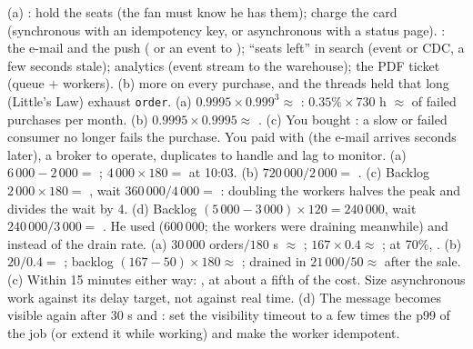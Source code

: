  (a) : hold the seats (the fan must know he has them); charge the card (synchronous with an idempotency key, or asynchronous with a status page). : the e-mail and the push ( or an event to ); ``seats left'' in search (event or CDC, a few seconds stale); analytics (event stream to the warehouse); the PDF ticket (queue $+$ workers). (b)  more on every purchase, and the threads held that long (Little's Law) exhaust \texttt{order}.
 (a) $0.9995 \times 0.999^3 \approx$ : $0.35\% \times 730$ h $\approx$  of failed purchases per month. (b) $0.9995 \times 0.9995 \approx$ . (c) You bought : a slow or failed consumer no longer fails the purchase. You paid with  (the e-mail arrives seconds later), a broker to operate, duplicates to handle and lag to monitor.
 (a) $6\,000 - 2\,000 =$ ; $4\,000 \times 180 =$  at 10:03. (b) $720\,000 / 2\,000 =$ . (c) Backlog $2\,000 \times 180 =$ , wait $360\,000/4\,000 =$ : doubling the workers halves the peak and divides the wait by 4. (d) Backlog $(5\,000 - 3\,000) \times 120 = 240\,000$, wait $240\,000/3\,000 =$ . He used  (600\,000; the workers were draining meanwhile) and  instead of the drain rate.
 (a) $30\,000$ orders$/180$ s $\approx$ ; $167 \times 0.4 \approx$ ; at 70\%, . (b) $20/0.4 =$ ; backlog $(167 - 50) \times 180 \approx$ ; drained in $21\,000/50 \approx$  after the sale. (c) Within 15 minutes either way: , at about a fifth of the cost. Size asynchronous work against its delay target, not against real time. (d) The message becomes visible again after 30 s and : set the visibility timeout to a few times the p99 of the job (or extend it while working) and make the worker idempotent.
